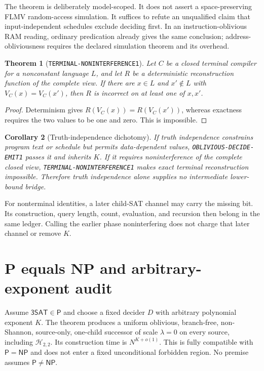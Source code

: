 \documentclass[11pt]{article}
\newtheorem{theorem}{Theorem}
\newtheorem{corollary}[theorem]{Corollary}
\newcommand{\SAT}{\mathsf{3SAT}}
\newcommand{\Htwo}{\mathcal H_{2,2}}
\begin{document}
The theorem is deliberately model-scoped.  It does not assert a
space-preserving FLMV random-access simulation.  It suffices to refute an
unqualified claim that input-independent schedules exclude deciding first.
In an instruction-oblivious RAM reading, ordinary predication already gives
the same conclusion; address-obliviousness requires the declared simulation
theorem and its overhead.

\begin{theorem}[\texttt{TERMINAL-NONINTERFERENCE1}]
Let $C$ be a closed terminal compiler for a nonconstant language $L$, and let
$R$ be a deterministic reconstruction function of the complete view.  If
there are $x\in L$ and $x'\notin L$ with $V_C(x)=V_C(x')$, then $R$ is
incorrect on at least one of $x,x'$.
\end{theorem}

\begin{proof}
Determinism gives
$R(V_C(x))=R(V_C(x'))$, whereas exactness requires the two values to be one
and zero.  This is impossible.
\end{proof}

\begin{corollary}[Truth-independence dichotomy]
If truth independence constrains program text or schedule but permits
data-dependent values, \texttt{OBLIVIOUS-DECIDE-EMIT1} passes it and inherits
$K$.  If it requires noninterference of the complete closed view,
\texttt{TERMINAL-NONINTERFERENCE1} makes exact terminal reconstruction
impossible.  Therefore truth independence alone supplies no intermediate
lower-bound bridge.
\end{corollary}

For nonterminal identities, a later child-SAT channel may carry the missing
bit.  Its construction, query length, count, evaluation, and recursion then
belong in the same ledger.  Calling the earlier phase noninterfering does not
charge that later channel or remove $K$.

\section{P equals NP and arbitrary-exponent audit}

Assume $\SAT\in\mathsf P$ and choose a fixed decider $D$ with arbitrary
polynomial exponent $K$.  The theorem produces a uniform oblivious,
branch-free, non-Shannon, source-only, one-child successor of scale
$\lambda=0$ on every source, including $\Htwo$.  Its construction time is
$N^{K+o(1)}$.  This is fully compatible with $\mathsf P=\mathsf{NP}$ and
does not enter a fixed unconditional forbidden region.  No premise assumes
$\mathsf P\ne\mathsf{NP}$.
\end{document}
